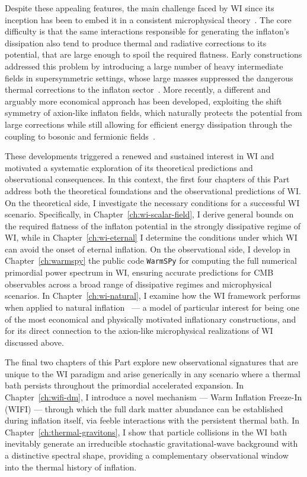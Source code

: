 Despite these appealing features, the main challenge faced by WI since its inception has been to embed it in a consistent microphysical theory~\cite{Yokoyama:1998ju}. The core difficulty is that the same interactions responsible for generating the inflaton's dissipation also tend to produce thermal and radiative corrections to its potential, that are large enough to spoil the required flatness. Early constructions addressed this problem by introducing a large number of heavy intermediate fields in supersymmetric settings, whose large masses suppressed the dangerous thermal corrections to the inflaton sector~\cite{Berera:2008ar,Bastero-Gil:2012akf}. More recently, a different and arguably more economical approach has been developed, exploiting the shift symmetry of axion-like inflaton fields, which naturally protects the potential from large corrections while still allowing for efficient energy dissipation through the coupling to bosonic and fermionic fields~\cite{Bastero-Gil:2016qru, Berghaus:2019whh}. 

These developments triggered a renewed and sustained interest in WI and motivated a systematic exploration of its theoretical predictions and observational consequences. In this context, the first four chapters of this Part address both the theoretical foundations and the observational predictions of WI. On the theoretical side, I investigate the necessary conditions for a successful WI scenario. Specifically, in Chapter~\ref{ch:wi-scalar-field}, I derive general bounds on the required flatness of the inflaton potential in the strongly dissipative regime of WI, while in Chapter~\ref{ch:wi-eternal} I determine the conditions under which WI can avoid the onset of eternal inflation. On the observational side, I develop in Chapter~\ref{ch:warmspy} the public code \texttt{WarmSPy} for computing the full numerical primordial power spectrum in WI, ensuring accurate predictions for CMB observables across a broad range of dissipative regimes and microphysical scenarios. In Chapter~\ref{ch:wi-natural}, I examine how the WI framework performs when applied to natural inflation~\cite{Freese:1990rb} --- a model of particular interest for being one of the most economical and physically motivated inflationary constructions, and for its direct connection to the axion-like microphysical realizations of WI discussed above.

The final two chapters of this Part explore new observational signatures that are unique to the WI paradigm and arise generically in any scenario where a thermal bath persists throughout the primordial accelerated expansion. In Chapter~\ref{ch:wifi-dm}, I introduce a novel mechanism --- Warm Inflation Freeze-In (WIFI) --- through which the full dark matter abundance can be established during inflation itself, via feeble interactions with the persistent thermal bath. In Chapter~\ref{ch:thermal-gravitons}, I show that particle collisions in the WI bath inevitably generate an irreducible stochastic gravitational-wave background with a distinctive spectral shape, providing a complementary observational window into the thermal history of inflation.





